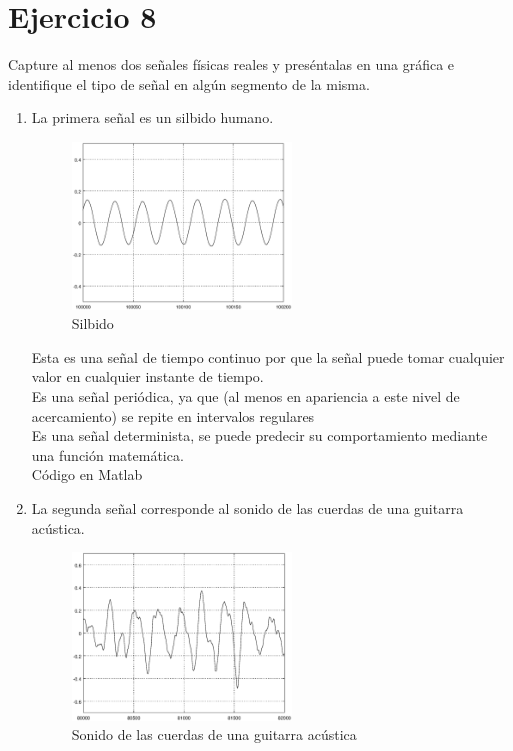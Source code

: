 \documentclass[10pt,a4paper]{report}
\begin{document}
\section{Ejercicio 8}
Capture al menos dos señales físicas reales y preséntalas en una  gráfica e identifique el tipo de señal en algún segmento de la misma.

\begin{enumerate}
  \item La primera señal es un silbido humano.
    \begin{figure}[H]
      \begin{center}
        \includegraphics[width=0.55\textwidth]{./Ejercicio8/Silbido}
        \caption{Silbido}
        \label{fig:Slib}
      \end{center}
    \end{figure}
    
Esta es una señal de tiempo continuo por que la señal puede tomar cualquier valor en cualquier instante de tiempo. \\
Es una señal periódica, ya que (al menos en apariencia a este nivel de acercamiento) se repite en intervalos regulares \\
Es una señal determinista, se puede predecir su comportamiento mediante una función matemática.\\
\newline Código en Matlab
    

\item La segunda señal corresponde al sonido de las cuerdas de una guitarra acústica.

\begin{figure}[H]
  \begin{center}
    \includegraphics[width=0.55\textwidth]{./Ejercicio8/Guitarra}
    \caption{Sonido de las cuerdas de una guitarra acústica}
    \label{fig:Guitar}
  \end{center}
\end{figure}


\end{enumerate}
\end{document}

